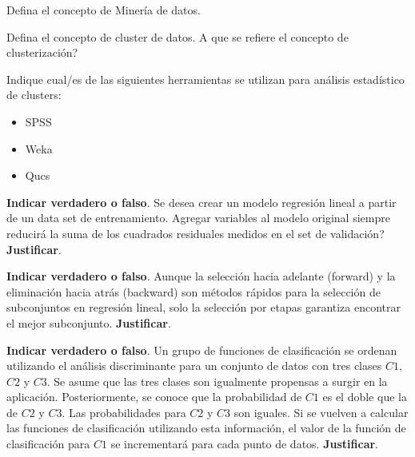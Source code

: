 \documentclass[11pt]{exam}
\begin{document}
%
%
%

\begin{questions}

\addpoints
\question[2] Defina el concepto de Minería de datos.
\vspace{3in}

\addpoints
\question[2] Defina el concepto de cluster de datos. A que se refiere el concepto de clusterización?
\vspace{3in}

\addpoints
\question[1] Indique cual/es de las siguientes herramientas se utilizan para análisis estadístico de clusters:
\begin{itemize}
\item SPSS
\item Weka
\item Qucs
\end{itemize}

\newpage
\addpoints
\question[2] \textbf{Indicar verdadero o falso}. Se desea crear un modelo regresión lineal a partir de un data set de entrenamiento. Agregar variables al modelo original siempre reducirá la suma de los cuadrados residuales medidos en el set de validación? \textbf{Justificar}.
\vspace{1in}

\addpoints
\question[1] \textbf{Indicar verdadero o falso}. Aunque la selección hacia adelante (forward) y la eliminación hacia atrás (backward) son métodos rápidos para la selección de subconjuntos en regresión lineal, solo la selección por etapas garantiza encontrar el mejor subconjunto. \textbf{Justificar}.
\vspace{1in}

\addpoints
\question[1] \textbf{Indicar verdadero o falso}. Un grupo de funciones de clasificación se ordenan utilizando el análisis discriminante para un conjunto de datos con tres clases $C1$, $C2$ y $C3$. Se asume que las tres clases son igualmente propensas a surgir en la aplicación. Posteriormente, se conoce que la probabilidad de $C1$ es el doble que la de $C2$ y $C3$. Las probabilidades para $C2$ y $C3$ son iguales. Si se  vuelven a calcular las funciones de clasificación utilizando esta información, el valor de la función de clasificación para $C1$ se incrementará para cada punto de datos. \textbf{Justificar}.
\vspace{1in}


\end{questions}
\end{document}
